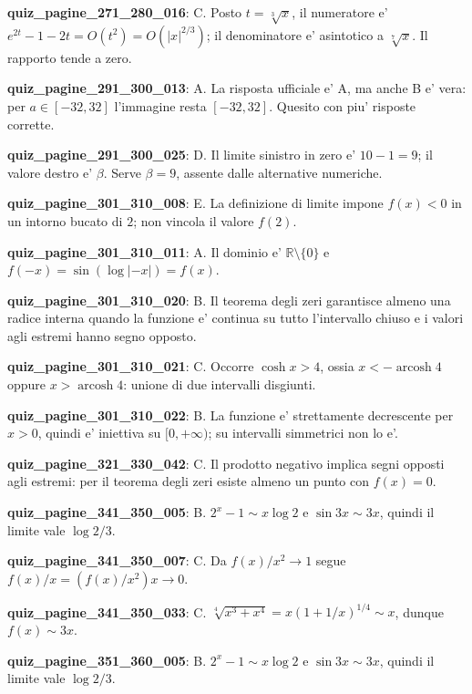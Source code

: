 \documentclass[11pt,a4paper]{article}
\newcounter{quiz}
\begin{document}
\noindent\textbf{quiz\_pagine\_271\_280\_016}: C. Posto $t=\sqrt[3]x$, il numeratore e' $e^{2t}-1-2t=O(t^2)=O(|x|^{2/3})$; il denominatore e' asintotico a $\sqrt[7]x$. Il rapporto tende a zero.\par\medskip
\noindent\textbf{quiz\_pagine\_291\_300\_013}: A. La risposta ufficiale e' A, ma anche B e' vera: per $a\in[-32,32]$ l'immagine resta $[-32,32]$. Quesito con piu' risposte corrette.\par\medskip
\noindent\textbf{quiz\_pagine\_291\_300\_025}: D. Il limite sinistro in zero e' $10-1=9$; il valore destro e' $\beta$. Serve $\beta=9$, assente dalle alternative numeriche.\par\medskip
\noindent\textbf{quiz\_pagine\_301\_310\_008}: E. La definizione di limite impone $f(x)<0$ in un intorno bucato di $2$; non vincola il valore $f(2)$.\par\medskip
\noindent\textbf{quiz\_pagine\_301\_310\_011}: A. Il dominio e' $\mathbb R\setminus\{0\}$ e $f(-x)=\sin(\log|-x|)=f(x)$.\par\medskip
\noindent\textbf{quiz\_pagine\_301\_310\_020}: B. Il teorema degli zeri garantisce almeno una radice interna quando la funzione e' continua su tutto l'intervallo chiuso e i valori agli estremi hanno segno opposto.\par\medskip
\noindent\textbf{quiz\_pagine\_301\_310\_021}: C. Occorre $\cosh x>4$, ossia $x<-\operatorname{arcosh}4$ oppure $x>\operatorname{arcosh}4$: unione di due intervalli disgiunti.\par\medskip
\noindent\textbf{quiz\_pagine\_301\_310\_022}: B. La funzione e' strettamente decrescente per $x>0$, quindi e' iniettiva su $[0,+\infty)$; su intervalli simmetrici non lo e'.\par\medskip
\noindent\textbf{quiz\_pagine\_321\_330\_042}: C. Il prodotto negativo implica segni opposti agli estremi: per il teorema degli zeri esiste almeno un punto con $f(x)=0$.\par\medskip
\noindent\textbf{quiz\_pagine\_341\_350\_005}: B. $2^x-1\sim x\log2$ e $\sin3x\sim3x$, quindi il limite vale $\log2/3$.\par\medskip
\noindent\textbf{quiz\_pagine\_341\_350\_007}: C. Da $f(x)/x^2\to1$ segue $f(x)/x=(f(x)/x^2)x\to0$.\par\medskip
\noindent\textbf{quiz\_pagine\_341\_350\_033}: C. $\sqrt[4]{x^3+x^4}=x(1+1/x)^{1/4}\sim x$, dunque $f(x)\sim3x$.\par\medskip
\noindent\textbf{quiz\_pagine\_351\_360\_005}: B. $2^x-1\sim x\log2$ e $\sin3x\sim3x$, quindi il limite vale $\log2/3$.\par\medskip
\end{document}

